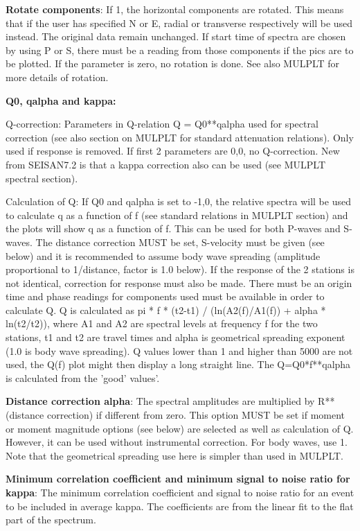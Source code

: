 \textbf{Rotate components}: If 1, the horizontal components are rotated. This means that if the user has specified N or E, radial or transverse respectively will be used instead. The original data remain unchanged. If start time of spectra are chosen by using P or S, there must be a reading from those components if the pics are to be plotted. If the parameter is zero, no rotation is done. See also MULPLT for more details of rotation. 

\textbf{Q0, qalpha and kappa:}

Q-correction: \newline
Parameters in Q-relation Q = Q0**qalpha used for spectral correction (see also section on MULPLT for standard attenuation relations). Only used if response is removed. If first 2 parameters are 0,0, no Q-correction. New from SEISAN7.2 is that a kappa correction also can be used (see MULPLT spectral section). 

Calculation of Q: \newline
If Q0 and qalpha is set to -1,0, the relative spectra will be used to calculate q as a function of f (see standard relations in MULPLT section) and the plots will show q as a function of f. This can be used for both P-waves and S-waves. The distance correction MUST be set, S-velocity must be given (see below) and it is recommended to assume body wave spreading (amplitude proportional to 1/distance, factor is 1.0 below). If the response of the 2 stations is not identical, correction for response must also be made. There must be an origin time and phase readings for components used must be available in order to calculate Q. Q is calculated as  pi * f * (t2-t1) / (ln(A2(f)/A1(f)) + alpha * ln(t2/t2)), where A1 and A2 are spectral levels at frequency f for the two stations, t1 and t2 are travel times and alpha is geometrical spreading exponent (1.0 is body wave spreading). Q values lower than 1 and higher than 5000 are not used, the Q(f) plot might then display a long straight line. The Q=Q0*f**qalpha is calculated from the 'good' values'. 

\textbf{Distance correction alpha}: The spectral amplitudes are multiplied by R**(distance correction) if different from zero. This option MUST be set if moment or moment magnitude options (see below) are selected as well as calculation of Q. However, it can be used without instrumental correction. For body waves, use 1. Note that the geometrical spreading use here is simpler than used in MULPLT. 

\textbf{Minimum correlation coefficient and minimum signal to noise ratio for kappa}: The minimum correlation coefficient and signal to noise ratio for an event to be included in average kappa. The coefficients are from the linear fit to the flat part of the spectrum. 

